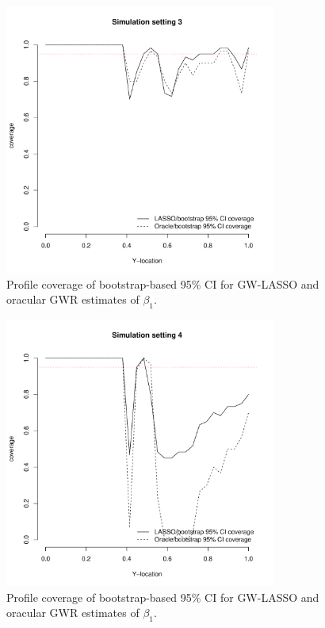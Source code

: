 \documentclass[authoryear, review, 11pt]{elsarticle}
\begin{document}
	\begin{figure}
		\begin{center}
			\includegraphics[height=3.5in]{../../figures/simulation/28-3-profile-coverage.pdf}
			\caption{Profile coverage of bootstrap-based 95\% CI for GW-LASSO and oracular GWR estimates of $\beta_1$.\label{fig:simulation-3-coverage}}
		\end{center}
	\end{figure}
	
	\begin{figure}
		\begin{center}
			\includegraphics[height=3.5in]{../../figures/simulation/28-4-profile-coverage.pdf}
			\caption{Profile coverage of bootstrap-based 95\% CI for GW-LASSO and oracular GWR estimates of $\beta_1$.\label{fig:simulation-4-coverage}}
		\end{center}
	\end{figure}
	
\end{document}

